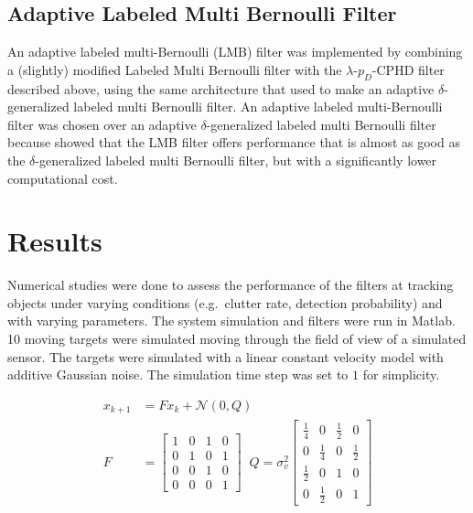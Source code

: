 \documentclass{article}
\begin{document}
\subsection*{Adaptive Labeled Multi Bernoulli Filter}
An adaptive labeled multi-Bernoulli (LMB) filter was implemented by combining a (slightly) modified Labeled Multi Bernoulli\cite{lmb} filter with the $\lambda$-$p_D$-CPHD filter described above, using the same architecture that \cite{adaptive_dglmb} used to make an adaptive $\delta$-generalized labeled multi Bernoulli filter. An adaptive labeled multi-Bernoulli filter was chosen over an adaptive $\delta$-generalized labeled multi Bernoulli filter because \cite{lmb} showed that the LMB filter offers performance that is almost as good as the $\delta$-generalized labeled multi Bernoulli filter, but with a significantly lower computational cost.

\section*{Results}
Numerical studies were done to assess the performance of the filters at tracking objects under varying conditions (e.g.\ clutter rate, detection probability) and with varying parameters. The system simulation and filters were run in Matlab. 10 moving targets were simulated moving through the field of view of a simulated sensor. The targets were simulated with a linear constant velocity model with additive Gaussian noise. The simulation time step was set to $1$ for simplicity.

\begin{align}
  x_{k+1} &= Fx_k + \mathcal{N}(0, Q)\\
  F &=
  \begin{bmatrix}
    1 & 0 & 1 & 0\\
    0 & 1 & 0 & 1\\
    0 & 0 & 1 & 0\\
    0 & 0 & 0 & 1
  \end{bmatrix}\;\;
                Q
                = \sigma^2_v
  \begin{bmatrix}
    \frac{1}{4} & 0 & \frac{1}{2} & 0\\
    0 & \frac{1}{4} & 0 & \frac{1}{2}\\
     \frac{1}{2} & 0 & 1 & 0\\
    0 &  \frac{1}{2} & 0 & 1
  \end{bmatrix}\\           
\end{align}
\end{document}
